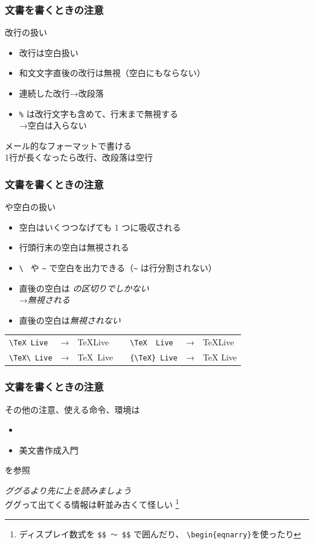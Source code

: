 \begin{frame}[fragile]
	\frametitle{文書を書くときの注意}
	\begin{block}{改行の扱い}
		\begin{itemize}
			\item 改行は空白扱い
			\item 和文文字直後の改行は無視（空白にもならない）
			\item 連続した改行→改段落
			\item \verb+%+ は改行文字も含めて、行末まで無視する\\
				→空白は入らない
		\end{itemize}
	\end{block}
	
	メール的なフォーマットで書ける\\
	{\footnotesize 1行が長くなったら改行、改段落は空行}
\end{frame}

\begin{frame}[fragile]
	\frametitle{文書を書くときの注意}
	\begin{block}{や空白の扱い}
		\begin{itemize}
			\item 空白はいくつつなげても 1 つに吸収される
			\item 行頭行末の空白は無視される
			\item \verb*+\ + や \verb+~+ で空白を出力できる（\verb+~+ は行分割されない）
			\item {}直後の空白は
				\emph{の区切りでしかない}\\
				→\emph{無視される}
			\item {}直後の空白は\emph{無視されない}
		\end{itemize}
	\end{block}
	
	\bgroup\scriptsize
	\begin{tabular}{lclclcl}
		\verb*+\TeX Live+&→&\TeX Live&\hspace*{3em}&\verb*+\TeX  Live+&→&\TeX  Live\\
		\verb*+\TeX\ Live+&→&\TeX\ Live&&\verb*+{\TeX} Live+&→&{\TeX} Live
	\end{tabular}
	\egroup
\end{frame}

\begin{frame}
	\frametitle{文書を書くときの注意}
	その他の注意、使える命令、環境は
	\begin{itemize}
		\item {}
		\item 美文書作成入門
	\end{itemize}
	を参照
	
	\emph{ググるより先に上を読みましょう}\\
	{\footnotesize ググって出てくる情報は軒並み古くて怪しい
	\footnote{ディスプレイ数式を \texttt{\$\$ 〜 \$\$} で囲んだり、
	\texttt{\textbackslash begin\{eqnarry\}}を使ったり}}
\end{frame}

